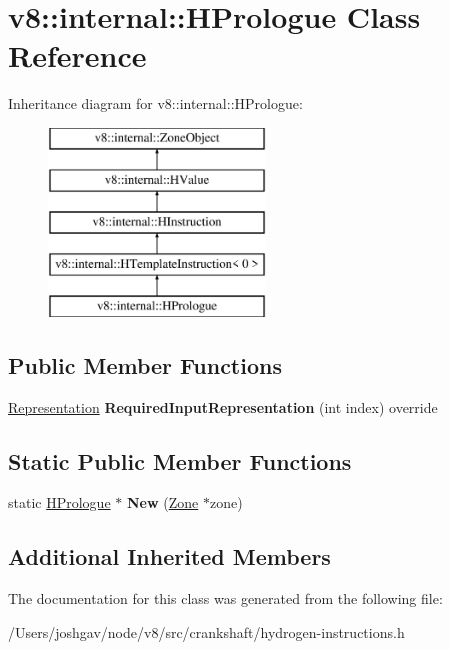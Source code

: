 \hypertarget{classv8_1_1internal_1_1_h_prologue}{}\section{v8\+:\+:internal\+:\+:H\+Prologue Class Reference}
\label{classv8_1_1internal_1_1_h_prologue}
Inheritance diagram for v8\+:\+:internal\+:\+:H\+Prologue\+:\begin{figure}[H]
\begin{center}
\leavevmode
\includegraphics[height=5.000000cm]{classv8_1_1internal_1_1_h_prologue}
\end{center}
\end{figure}
\subsection*{Public Member Functions}
\begin{DoxyCompactItemize}
\item 
\hyperlink{classv8_1_1internal_1_1_representation}{Representation} {\bfseries Required\+Input\+Representation} (int index) override\hypertarget{classv8_1_1internal_1_1_h_prologue_af56dea4cdbb054936479f503c05b9e54}{}\label{classv8_1_1internal_1_1_h_prologue_af56dea4cdbb054936479f503c05b9e54}

\end{DoxyCompactItemize}
\subsection*{Static Public Member Functions}
\begin{DoxyCompactItemize}
\item 
static \hyperlink{classv8_1_1internal_1_1_h_prologue}{H\+Prologue} $\ast$ {\bfseries New} (\hyperlink{classv8_1_1internal_1_1_zone}{Zone} $\ast$zone)\hypertarget{classv8_1_1internal_1_1_h_prologue_aac56b5d68d1f7c6863908e839ddef1ac}{}\label{classv8_1_1internal_1_1_h_prologue_aac56b5d68d1f7c6863908e839ddef1ac}

\end{DoxyCompactItemize}
\subsection*{Additional Inherited Members}


The documentation for this class was generated from the following file\+:\begin{DoxyCompactItemize}
\item 
/\+Users/joshgav/node/v8/src/crankshaft/hydrogen-\/instructions.\+h\end{DoxyCompactItemize}
